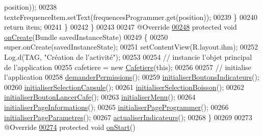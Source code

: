 \begin{DoxyCode}
      position));
00238                 texteFrequenceItem.setText(frequencesProgrammer.get(position));
00239             \}
00240             \textcolor{keywordflow}{return} item;
00241         \}
00242     \}
00243 
00247     @Override
\hyperlink{classcom_1_1example_1_1ekawa_1_1_ihm_af37a1d1d731eaed5e9cc19d23475ede3}{00248}     \textcolor{keyword}{protected} \textcolor{keywordtype}{void} \hyperlink{classcom_1_1example_1_1ekawa_1_1_ihm_af37a1d1d731eaed5e9cc19d23475ede3}{onCreate}(Bundle savedInstanceState)
00249     \{
00250         super.onCreate(savedInstanceState);
00251         setContentView(R.layout.ihm);
00252         Log.d(TAG, \textcolor{stringliteral}{"Création de l'activité"});
00253 
00254         \textcolor{comment}{// instancie l'objet principal de l'application}
00255         cafetiere = \textcolor{keyword}{new} \hyperlink{classcom_1_1example_1_1ekawa_1_1_cafetiere}{Cafetiere}(\textcolor{keyword}{this});
00256 
00257         \textcolor{comment}{// initialise l'application}
00258         \hyperlink{classcom_1_1example_1_1ekawa_1_1_ihm_a30e0dc3bf57b1abc608cb8b932527566}{demanderPermissions}();
00259         \hyperlink{classcom_1_1example_1_1ekawa_1_1_ihm_ae38db41c355bc415b46f21f9d608d4b9}{initialiserBoutonsIndicateurs}();
00260         \hyperlink{classcom_1_1example_1_1ekawa_1_1_ihm_a32a1b0d802eef67b6c838d8839de7bdb}{initialiserSelectionCapsule}();
00261         \hyperlink{classcom_1_1example_1_1ekawa_1_1_ihm_a0a4086cea2ee9d6d18c957513706cbce}{initialiserSelectionBoisson}();
00262         \hyperlink{classcom_1_1example_1_1ekawa_1_1_ihm_a6616a5f240867f43c8e56f2b432e43be}{initialiserBoutonLancerCafe}();
00263         \hyperlink{classcom_1_1example_1_1ekawa_1_1_ihm_a60968cecc69df879805b531a5f2ae19c}{initialiserMenu}();
00264         \hyperlink{classcom_1_1example_1_1ekawa_1_1_ihm_ad431346f0a437b4f23697208c5048a02}{initialiserPageInformations}();
00265         \hyperlink{classcom_1_1example_1_1ekawa_1_1_ihm_aa5ef2c0c4b4cefb518ec4f3e05b098aa}{initialiserPageProgrammer}();
00266         \hyperlink{classcom_1_1example_1_1ekawa_1_1_ihm_af18a3c8df11503003c92e8e5de89b7c3}{initialiserPageParametres}();
00267         \hyperlink{classcom_1_1example_1_1ekawa_1_1_ihm_a2c3740dd5be20b3111b36649514fd41e}{actualiserIndicateurs}();
00268     \}
00269 
00273     @Override
\hyperlink{classcom_1_1example_1_1ekawa_1_1_ihm_a5cf91e6625760cbdca208988a08e86f6}{00274}     \textcolor{keyword}{protected} \textcolor{keywordtype}{void} \hyperlink{classcom_1_1example_1_1ekawa_1_1_ihm_a5cf91e6625760cbdca208988a08e86f6}{onStart}()

\end{DoxyCode}
